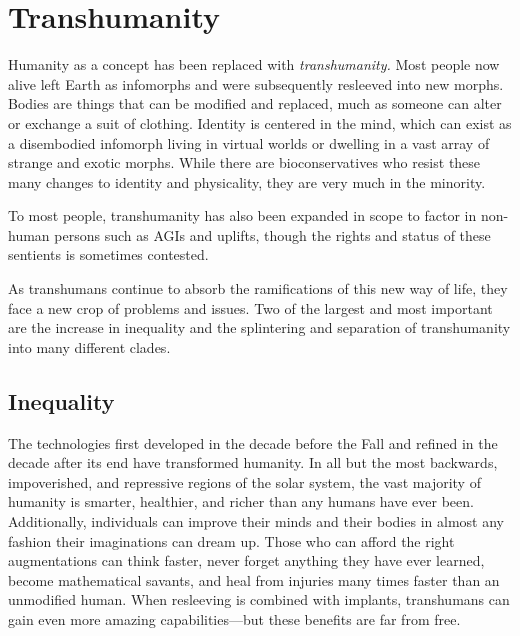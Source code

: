 \section{Transhumanity}

Humanity as a concept has been replaced with 
\textit{transhumanity.} Most people now alive left Earth as 
infomorphs and were subsequently resleeved into new 
morphs. Bodies are things that can be modified and 
replaced, much as someone can alter or exchange a 
suit of clothing. Identity is centered in the mind, which 
can exist as a disembodied infomorph living in virtual
worlds or dwelling in a vast array of strange and
exotic morphs. While there are bioconservatives who 
resist these many changes to identity and physicality, 
they are very much in the minority.

To most people, transhumanity has also been expanded
in scope to factor in non-human persons such
as AGIs and uplifts, though the rights and status of 
these sentients is sometimes contested.

As transhumans continue to absorb the ramifications
of this new way of life, they face a new crop
of problems and issues. Two of the largest and most 
important are the increase in inequality and the splintering
and separation of transhumanity into many
different clades.

\subsection{Inequality}

The technologies first developed in the decade before 
the Fall and refined in the decade after its end have 
transformed humanity. In all but the most backwards, 
impoverished, and repressive regions of the solar 
system, the vast majority of humanity is smarter, 
healthier, and richer than any humans 
have ever been. Additionally, individuals 
can improve their minds and their bodies 
in almost any fashion their imaginations 
can dream up. Those who can afford the 
right augmentations can think faster, never 
forget anything they have ever learned, 
become mathematical savants, and heal 
from injuries many times faster than an 
unmodified human. When resleeving is 
combined with implants, transhumans can 
gain even more amazing capabilities—but 
these benefits are far from free.

